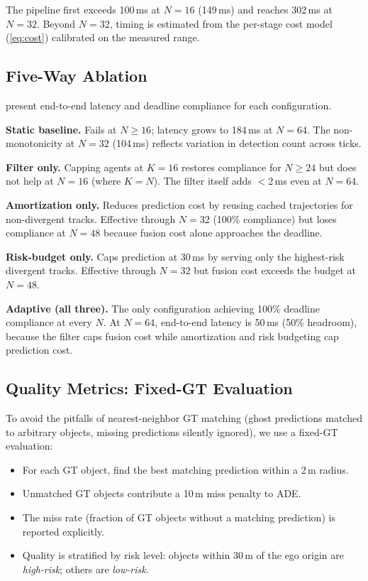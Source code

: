 The pipeline first exceeds 100\,ms at $N{=}16$ (149\,ms) and reaches
302\,ms at $N{=}32$.  Beyond $N{=}32$, timing is estimated
from the per-stage cost model (\cref{eq:cost}) calibrated on the
measured range.

\subsection{Five-Way Ablation}

 present end-to-end
latency and deadline compliance for each configuration.

\textbf{Static baseline.}  Fails at $N{\geq}16$; latency grows to
184\,ms at $N{=}64$.  The non-monotonicity at $N{=}32$ (104\,ms)
reflects variation in detection count across ticks.

\textbf{Filter only.}  Capping agents at $K{=}16$ restores compliance
for $N{\geq}24$ but does not help at $N{=}16$ (where $K{=}N$).
The filter itself adds $<$2\,ms even at $N{=}64$.

\textbf{Amortization only.}  Reduces prediction cost by reusing cached
trajectories for non-divergent tracks.  Effective through $N{=}32$
(100\% compliance) but loses compliance at $N{=}48$ because fusion cost
alone approaches the deadline.

\textbf{Risk-budget only.}  Caps prediction at 30\,ms by serving only
the highest-risk divergent tracks.  Effective through $N{=}32$ but
fusion cost exceeds the budget at $N{=}48$.

\textbf{Adaptive (all three).}  The only configuration achieving
100\% deadline compliance at every $N$.  At $N{=}64$, end-to-end
latency is 50\,ms (50\% headroom), because the filter caps fusion
cost while amortization and risk budgeting cap prediction cost.

\subsection{Quality Metrics: Fixed-GT Evaluation}

To avoid the pitfalls of nearest-neighbor GT matching
(ghost predictions matched to arbitrary objects, missing predictions
silently ignored), we use a fixed-GT evaluation:
\begin{itemize}
  \item For each GT object, find the best matching prediction within
    a 2\,m radius.
  \item Unmatched GT objects contribute a 10\,m miss penalty to ADE.
  \item The miss rate (fraction of GT objects without a matching
    prediction) is reported explicitly.
  \item Quality is stratified by risk level: objects within 30\,m of
    the ego origin are \emph{high-risk}; others are \emph{low-risk}.
\end{itemize}

